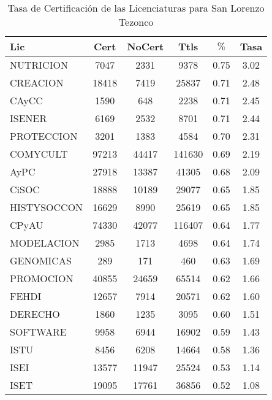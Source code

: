 \documentclass{article}
\begin{document}
\begin{table}[h]
\centering
\begin{tabular}{|l|cc|c|cc|}\hline
Lic & Cert & NoCert & Ttls & $\%$ & Tasa \\\hline\hline
NUTRICION & 7047 & 2331 & 9378 & 0.75 & 3.02 \\\hline\hline
CREACION & 18418 & 7419 & 25837 & 0.71 & 2.48 \\
CAyCC & 1590 & 648 & 2238 & 0.71 & 2.45 \\
ISENER & 6169 & 2532 & 8701 & 0.71 & 2.44 \\
PROTECCION & 3201 & 1383 & 4584 & 0.70 & 2.31 \\
COMYCULT & 97213 & 44417 & 141630 & 0.69 & 2.19 \\
AyPC & 27918 & 13387 & 41305 & 0.68 & 2.09 \\\hline\hline
CiSOC & 18888 & 10189 & 29077 & 0.65 & 1.85 \\
HISTYSOCCON & 16629 & 8990 & 25619 & 0.65 & 1.85 \\
CPyAU & 74330 & 42077 & 116407 & 0.64 & 1.77 \\
MODELACION & 2985 & 1713 & 4698 & 0.64 & 1.74 \\
GENOMICAS & 289 & 171 & 460 & 0.63 & 1.69 \\
PROMOCION & 40855 & 24659 & 65514 & 0.62 & 1.66 \\
FEHDI & 12657 & 7914 & 20571 & 0.62 & 1.60 \\\hline
DERECHO & 1860 & 1235 & 3095 & 0.60 & 1.51 \\
SOFTWARE & 9958 & 6944 & 16902 & 0.59 & 1.43 \\
ISTU & 8456 & 6208 & 14664 & 0.58 & 1.36 \\
ISEI & 13577 & 11947 & 25524 & 0.53 & 1.14 \\
ISET & 19095 & 17761 & 36856 & 0.52 & 1.08 \\\hline\hline
\end{tabular}
\caption{Tasa de Certificación de las Licenciaturas para San Lorenzo Tezonco}
\end{table}
\end{document}

